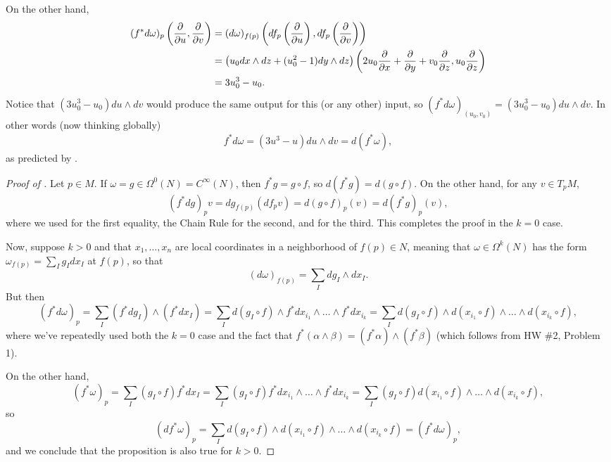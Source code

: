 \begin{example}
	On the other hand,
	\begin{align*}
		(f^\ast d\omega)_{p}\left(\frac{\partial}{\partial u}, \frac{\partial}{\partial v}\right) & = (d\omega)_{f(p)} \left(df_{p}\left(\frac{\partial}{\partial u}\right), df_p\left(\frac{\partial}{\partial v}\right)\right) \\
		 & = \left(\vphantom{x^2}u_0 dx \wedge dz + (u_0^2-1) dy \wedge dz\right)\left(2u_0 \frac{\partial}{\partial x} + \frac{\partial}{\partial y} + v_0\frac{\partial}{\partial z}, u_0\frac{\partial}{\partial z}\right) \\
		 & = 3u_0^3 -u_0.
	\end{align*}
	Notice that $(3u_0^3 -u_0)du \wedge dv $ would produce the same output for this (or any other) input, so $(f^\ast d\omega)_{(u_0,v_0)}= (3u_0^3 -u_0)du \wedge dv$. In other words (now thinking globally)
	\[
		f^\ast d\omega = (3u^3-u)du \wedge dv = d(f^\ast \omega),
	\]
	as predicted by .
\end{example}

\begin{proof}[Proof of ]
	 Let $p \in M$. If $\omega = g\in \Omega^0(N) = C^\infty(N)$, then $f^\ast g = g \circ f$, so $d(f^\ast g ) = d(g \circ f)$. On the other hand, for any $v \in T_pM$, 
	 \[
	 	(f^\ast dg)_pv = dg_{f(p)}(df_p v) = d(g \circ f)_p(v) = d(f^\ast g)_p(v),
	 \]
	 where we used  for the first equality, the Chain Rule for the second, and  for the third. This completes the proof in the $k=0$ case.
	 
	 Now, suppose $k > 0$ and that $x_1, \dots , x_n$ are local coordinates in a neighborhood of $f(p) \in N$, meaning that $\omega \in \Omega^k(N)$ has the form $\omega_{f(p)} = \sum_I g_I dx_I$ at $f(p)$, so that
	 \[
	 	(d\omega)_{f(p)} = \sum_I dg_I \wedge dx_I.
	 \]
	 But then
	 \[
	 	(f^\ast d\omega)_p = \sum_I (f^\ast dg_I) \wedge (f^\ast dx_I) = \sum_I d(g_I \circ f) \wedge f^\ast dx_{i_1} \wedge \dots \wedge f^\ast dx_{i_k} = \sum_I d(g_I \circ f) \wedge d(x_{i_1} \circ f) \wedge \dots \wedge d(x_{i_k} \circ f),
	 \]
	 where we've repeatedly used both the $k=0$ case and the fact that $f^\ast(\alpha \wedge \beta) = (f^\ast \alpha) \wedge (f^\ast \beta)$ (which follows from HW \#2, Problem 1).
	 
	 On the other hand,
	 \[
	 	(f^\ast\omega)_p = \sum_I (g_I \circ f) f^\ast dx_I = \sum_I (g_I \circ f) f^\ast dx_{i_1} \wedge \dots \wedge f^\ast dx_{i_k} = \sum_I (g_I \circ f) d (x_{i_1} \circ f) \wedge \dots \wedge d(x_{i_k} \circ f),
	 \]
	 so
	 \[
	 	(df^\ast \omega)_p = \sum_I d(g_I \circ f) \wedge d (x_{i_1} \circ f) \wedge \dots \wedge d(x_{i_k} \circ f) = (f^\ast d\omega)_p,
	 \]
	 and we conclude that the proposition is also true for $k>0$.
\end{proof}